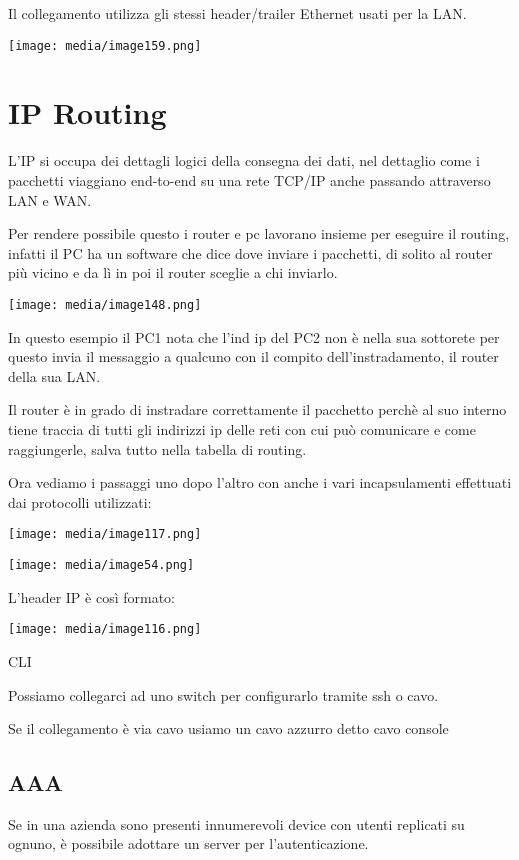Il collegamento utilizza gli stessi header/trailer Ethernet usati per la
LAN.

\texttt{[image: media/image159.png]}

\section{IP Routing}\label{ip-routing}

L'IP si occupa dei dettagli logici della consegna dei dati, nel
dettaglio come i pacchetti viaggiano end-to-end su una rete TCP/IP anche
passando attraverso LAN e WAN.

Per rendere possibile questo i router e pc lavorano insieme per eseguire
il routing, infatti il PC ha un software che dice dove inviare i
pacchetti, di solito al router più vicino e da lì in poi il router
sceglie a chi inviarlo.

\texttt{[image: media/image148.png]}

In questo esempio il PC1 nota che l'ind ip del PC2 non è nella sua
sottorete per questo invia il messaggio a qualcuno con il compito
dell'instradamento, il router della sua LAN.

Il router è in grado di instradare correttamente il pacchetto perchè al
suo interno tiene traccia di tutti gli indirizzi ip delle reti con cui
può comunicare e come raggiungerle, salva tutto nella tabella di
routing.

Ora vediamo i passaggi uno dopo l'altro con anche i vari incapsulamenti
effettuati dai protocolli utilizzati:

\texttt{[image: media/image117.png]}

\texttt{[image: media/image54.png]}

L'header IP è così formato:

\texttt{[image: media/image116.png]}

CLI

Possiamo collegarci ad uno switch per configurarlo tramite ssh o cavo.

Se il collegamento è via cavo usiamo un cavo azzurro detto cavo console

\subsection{AAA}\label{aaa}

Se in una azienda sono presenti innumerevoli device con utenti replicati
su ognuno, è possibile adottare un server per l'autenticazione.

